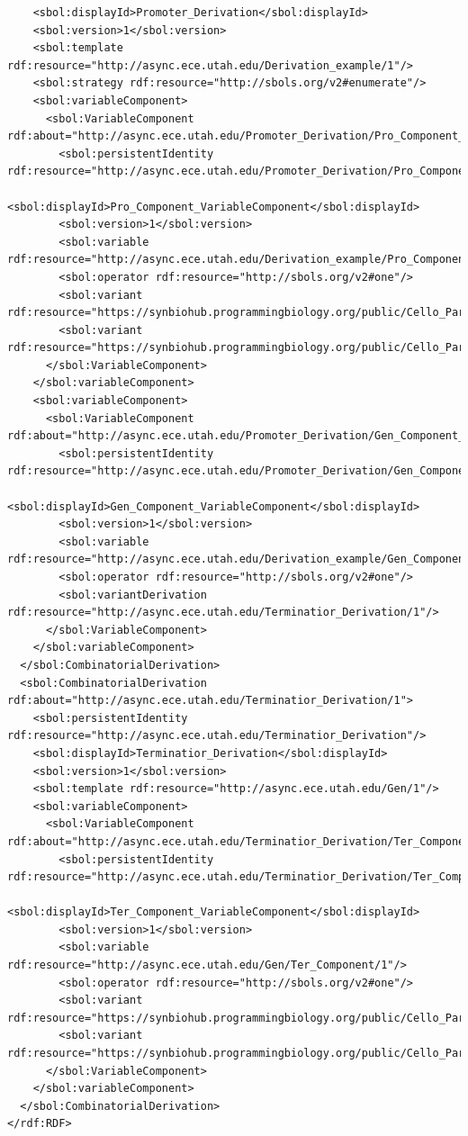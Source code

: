 \begin{lstlisting}
    <sbol:displayId>Promoter_Derivation</sbol:displayId>
    <sbol:version>1</sbol:version>
    <sbol:template rdf:resource="http://async.ece.utah.edu/Derivation_example/1"/>
    <sbol:strategy rdf:resource="http://sbols.org/v2#enumerate"/>
    <sbol:variableComponent>
      <sbol:VariableComponent rdf:about="http://async.ece.utah.edu/Promoter_Derivation/Pro_Component_VariableComponent/1">
        <sbol:persistentIdentity rdf:resource="http://async.ece.utah.edu/Promoter_Derivation/Pro_Component_VariableComponent"/>
        <sbol:displayId>Pro_Component_VariableComponent</sbol:displayId>
        <sbol:version>1</sbol:version>
        <sbol:variable rdf:resource="http://async.ece.utah.edu/Derivation_example/Pro_Component/1"/>
        <sbol:operator rdf:resource="http://sbols.org/v2#one"/>
        <sbol:variant rdf:resource="https://synbiohub.programmingbiology.org/public/Cello_Parts/pBetI/1"/>
        <sbol:variant rdf:resource="https://synbiohub.programmingbiology.org/public/Cello_Parts/pAmtR/1"/>
      </sbol:VariableComponent>
    </sbol:variableComponent>
    <sbol:variableComponent>
      <sbol:VariableComponent rdf:about="http://async.ece.utah.edu/Promoter_Derivation/Gen_Component_VariableComponent/1">
        <sbol:persistentIdentity rdf:resource="http://async.ece.utah.edu/Promoter_Derivation/Gen_Component_VariableComponent"/>
        <sbol:displayId>Gen_Component_VariableComponent</sbol:displayId>
        <sbol:version>1</sbol:version>
        <sbol:variable rdf:resource="http://async.ece.utah.edu/Derivation_example/Gen_Component/1"/>
        <sbol:operator rdf:resource="http://sbols.org/v2#one"/>
        <sbol:variantDerivation rdf:resource="http://async.ece.utah.edu/Terminatior_Derivation/1"/>
      </sbol:VariableComponent>
    </sbol:variableComponent>
  </sbol:CombinatorialDerivation>
  <sbol:CombinatorialDerivation rdf:about="http://async.ece.utah.edu/Terminatior_Derivation/1">
    <sbol:persistentIdentity rdf:resource="http://async.ece.utah.edu/Terminatior_Derivation"/>
    <sbol:displayId>Terminatior_Derivation</sbol:displayId>
    <sbol:version>1</sbol:version>
    <sbol:template rdf:resource="http://async.ece.utah.edu/Gen/1"/>
    <sbol:variableComponent>
      <sbol:VariableComponent rdf:about="http://async.ece.utah.edu/Terminatior_Derivation/Ter_Component_VariableComponent/1">
        <sbol:persistentIdentity rdf:resource="http://async.ece.utah.edu/Terminatior_Derivation/Ter_Component_VariableComponent"/>
        <sbol:displayId>Ter_Component_VariableComponent</sbol:displayId>
        <sbol:version>1</sbol:version>
        <sbol:variable rdf:resource="http://async.ece.utah.edu/Gen/Ter_Component/1"/>
        <sbol:operator rdf:resource="http://sbols.org/v2#one"/>
        <sbol:variant rdf:resource="https://synbiohub.programmingbiology.org/public/Cello_Parts/L3S3P31/1"/>
        <sbol:variant rdf:resource="https://synbiohub.programmingbiology.org/public/Cello_Parts/L3S2P55/1"/>
      </sbol:VariableComponent>
    </sbol:variableComponent>
  </sbol:CombinatorialDerivation>
</rdf:RDF>
\end{lstlisting}
